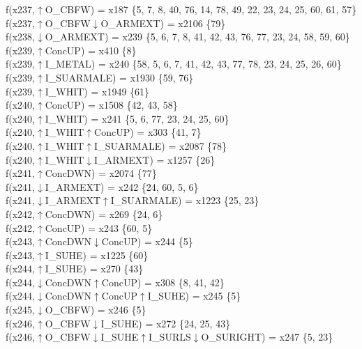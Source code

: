 f(x237,$\uparrow$O\_CBFW) = x187 \{5, 7, 8, 40, 76, 14, 78, 49, 22, 23, 24, 25, 60, 61, 57\} \\  
f(x237,$\uparrow$O\_CBFW$\downarrow$O\_ARMEXT) = x2106 \{79\} \\  
f(x238,$\downarrow$O\_ARMEXT) = x239 \{5, 6, 7, 8, 41, 42, 43, 76, 77, 23, 24, 58, 59, 60\} \\  
f(x239,$\uparrow$ConcUP) = x410 \{8\} \\  
f(x239,$\uparrow$I\_METAL) = x240 \{58, 5, 6, 7, 41, 42, 43, 77, 78, 23, 24, 25, 26, 60\} \\  
f(x239,$\uparrow$I\_SUARMALE) = x1930 \{59, 76\} \\  
f(x239,$\uparrow$I\_WHIT) = x1949 \{61\} \\  
f(x240,$\uparrow$ConcUP) = x1508 \{42, 43, 58\} \\  
f(x240,$\uparrow$I\_WHIT) = x241 \{5, 6, 77, 23, 24, 25, 60\} \\  
f(x240,$\uparrow$I\_WHIT$\uparrow$ConcUP) = x303 \{41, 7\} \\  
f(x240,$\uparrow$I\_WHIT$\uparrow$I\_SUARMALE) = x2087 \{78\} \\  
f(x240,$\uparrow$I\_WHIT$\downarrow$I\_ARMEXT) = x1257 \{26\} \\  
f(x241,$\uparrow$ConcDWN) = x2074 \{77\} \\  
f(x241,$\downarrow$I\_ARMEXT) = x242 \{24, 60, 5, 6\} \\  
f(x241,$\downarrow$I\_ARMEXT$\uparrow$I\_SUARMALE) = x1223 \{25, 23\} \\  
f(x242,$\uparrow$ConcDWN) = x269 \{24, 6\} \\  
f(x242,$\uparrow$ConcUP) = x243 \{60, 5\} \\  
f(x243,$\uparrow$ConcDWN$\downarrow$ConcUP) = x244 \{5\} \\  
f(x243,$\uparrow$I\_SUHE) = x1225 \{60\} \\  
f(x244,$\uparrow$I\_SUHE) = x270 \{43\} \\  
f(x244,$\downarrow$ConcDWN$\uparrow$ConcUP) = x308 \{8, 41, 42\} \\  
f(x244,$\downarrow$ConcDWN$\uparrow$ConcUP$\uparrow$I\_SUHE) = x245 \{5\} \\  
f(x245,$\downarrow$O\_CBFW) = x246 \{5\} \\  
f(x246,$\uparrow$O\_CBFW$\downarrow$I\_SUHE) = x272 \{24, 25, 43\} \\  
f(x246,$\uparrow$O\_CBFW$\downarrow$I\_SUHE$\uparrow$I\_SURLS$\downarrow$O\_SURIGHT) = x247 \{5, 23\} \\  
